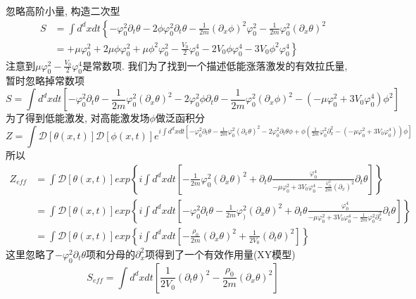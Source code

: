 \documentclass[a4paper,11pt]{article}
\begin{document}
忽略高阶小量, 构造二次型
\begin{equation*}
  \begin{split}
     S&=\int d^dxdt\left\{-\varphi_0^2\partial_t\theta-2\phi\varphi_0^2\partial_t\theta-\frac{1}{2m}(\partial_x\phi)^2\varphi_0^2-\frac{1}{2m}\varphi_0^2(\partial_x\theta)^2\right.\\
       &=\left.+\mu\varphi_0^2+2\mu\phi\varphi_0^2+\mu\phi^2\varphi_0^2-\frac{V_0}{2}\varphi_0^4-2V_0\phi\varphi_0^4-3V_0\phi^2\varphi_0^4\right\}
  \end{split}
\end{equation*}
注意到$\mu\varphi_0^2-\frac{V_0}{2}\varphi_0^4$是常数项. 我们为了找到一个描述低能涨落激发的有效拉氏量, 暂时忽略掉常数项
\begin{equation*}
  S=\int d^dxdt\left[-\varphi_0^2\partial_t\theta-\frac{1}{2m}\varphi_0^2(\partial_x\theta)^2-2\varphi_0^2\phi\partial_t\theta-\frac{1}{2m}\varphi_0^2(\partial_x\phi)^2-(-\mu\varphi_0^2+3V_0\varphi_0^4)\phi^2\right]
\end{equation*}
为了得到低能激发, 对高能激发场$\phi$做泛函积分
\begin{equation*}
  Z=\int\mathcal{D}[\theta(x,t)]\mathcal{D}[\phi(x,t)]e^{i\int d^dxdt[-\varphi_0^2\partial_t\theta-\frac{1}{2m}\varphi_0^2(\partial_x\theta)^2-2\varphi_0^2\partial_t\theta\phi+\phi(\frac{1}{2m}\varphi_0^2\partial_x^2-(-\mu\varphi_0^2+3V_0\varphi_0^4))\phi]}
\end{equation*}
所以
\begin{equation*}
  \begin{split}
     Z_{eff}&=\int\mathcal{D}[\theta(x,t)]exp\left\{i\int d^dxdt\left[-\frac{1}{2m}\varphi_0^2(\partial_x\theta)^2+\partial_t\theta\frac{\varphi_0^4}{-\mu\varphi_0^2+3V_0\varphi_0^4-\frac{\varphi_0^2}{2m}(\partial_x)^2}\partial_t\theta\right]\right\}\\
       &=\int\mathcal{D}[\theta(x,t)]exp\left\{i\int d^dxdt\left[-\varphi_0^2\partial_t\theta-\frac{1}{2m}\varphi_)^2(\partial_x\theta)^2+\partial_t\theta\frac{\varphi_0^4}{-\mu\varphi_0^2+3V_0\varphi_0^4-\frac{1}{2m}\varphi_0^2\partial_x^2}\partial_t\theta\right]\right\}\\
       &=\int\mathcal{D}[\theta(x,t)]exp\left\{i\int d^dxdt\left[-\frac{\rho_0}{2m}(\partial_x\theta)^2+\frac{1}{2V_0}(\partial_t\theta)^2\right]\right\}
  \end{split}
\end{equation*}
这里忽略了$-\varphi_0^2\partial_t\theta$项和分母的$\partial_x^2$项得到了一个有效作用量(XY模型)
\begin{equation*}
  S_{eff}=\int d^dxdt\left[\frac{1}{2V_0}(\partial_t\theta)^2-\frac{\rho_0}{2m}(\partial_x\theta)^2\right]
\end{equation*}
\end{document}
